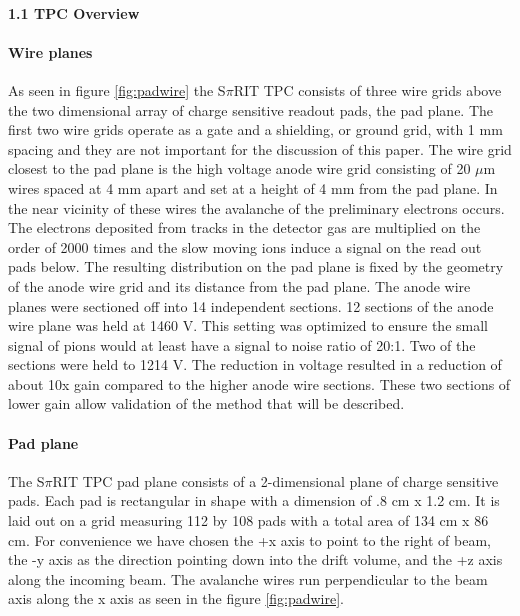 \documentclass[review]{elsarticle}
\begin{document}
\paragraph{1.1 TPC Overview}
\paragraph{Wire planes}
As seen in figure \ref{fig:padwire} the S$\pi$RIT TPC consists of three wire grids above the two dimensional array of charge sensitive readout pads, the pad plane. The first two wire grids operate as a gate and a shielding, or ground grid, with 1 mm spacing and they are not important for the discussion of this paper. The wire grid closest to the pad plane is the high voltage anode wire grid consisting of 20 $\mu$m wires spaced at 4 mm apart and set at a height of 4 mm from the pad plane. In the near vicinity of these wires the avalanche of the preliminary electrons occurs. The electrons deposited from tracks in the detector gas are multiplied on the order of 2000  times and the slow moving ions induce a signal on the read out pads below. The resulting distribution on the pad plane is fixed by the geometry of the anode wire grid and its distance from the pad plane. The anode wire planes were sectioned off into 14 independent sections. 12 sections of the anode wire plane was held at 1460 V. This setting was optimized to ensure the small signal of pions would at least have a signal to noise ratio of 20:1. Two of the sections were held to 1214 V. The reduction in voltage resulted in a reduction of about 10x gain compared to the higher anode wire sections. These two sections of lower gain allow validation of the method that will be described. 
\paragraph{Pad plane} 
The S$\pi$RIT TPC pad plane consists of a 2-dimensional plane of charge sensitive pads. Each pad is rectangular in shape with a dimension of .8 cm x 1.2 cm. It is laid out on a grid measuring 112 by 108 pads with a total area of 134 cm x 86 cm. For convenience we have chosen the +x axis to point to the right of beam, the -y axis as the direction pointing down into the drift volume, and the +z axis along the incoming beam. The avalanche wires run perpendicular to the beam axis along the x axis as seen in the figure \ref{fig:padwire}. 
\end{document}
